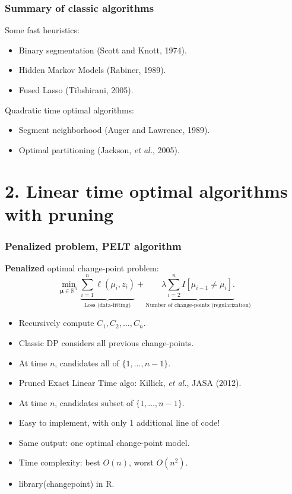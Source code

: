 \documentclass{beamer}
\newcommand{\RR}{\mathbb R}
\begin{document}
\begin{frame}
  \frametitle{Summary of classic algorithms}
  Some fast heuristics:
  \begin{itemize}
  \item Binary segmentation (Scott and Knott, 1974).
  \item Hidden Markov Models (Rabiner, 1989).
  \item Fused Lasso (Tibshirani, 2005).
  \end{itemize}
  Quadratic time optimal algorithms:
  \begin{itemize}
  \item Segment neighborhood (Auger and Lawrence, 1989).
  \item Optimal partitioning (Jackson, \emph{et al.}, 2005).
  \end{itemize}
\end{frame}

\section{2. Linear time optimal algorithms with pruning }

\begin{frame}
  \frametitle{Penalized problem, PELT algorithm}
  \textbf{Penalized} optimal change-point problem:
$$
\min_{
  \mathbf \mu\in\RR^{n}
}
\underbrace{\sum_{i=1}^{n} \ell( \mu_i,  z_i)}_{\text{Loss (data-fitting)}} + \underbrace{\lambda\sum_{i=2}^n I[\mu_{i-1}\neq \mu_i].}_{\text{Number of change-points (regularization)}}
$$
\begin{itemize}
\item Recursively compute $C_{1}, C_2,\dots, C_{n}$.
\item Classic DP considers all previous change-points.
\item At time $n$, candidates \alert {all of}  $\{1,\dots,n-1\}$.
\item Pruned Exact Linear Time algo: Killick, \emph{et al.}, JASA (2012).
\item At time $n$, candidates \alert{subset of} $\{1,\dots,n-1\}$.
\item Easy to implement, with only 1 additional line of code!
\item Same output: one optimal change-point model.
\item Time complexity: best $O(n)$, worst $O(n^2)$.
\item library(changepoint) in R.
\end{itemize}
\end{frame}
\end{document}
